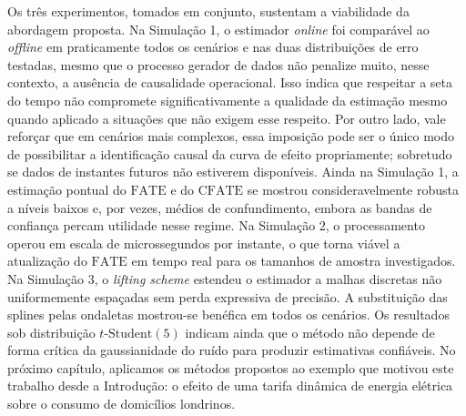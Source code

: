 Os três experimentos, tomados em conjunto, sustentam a viabilidade da abordagem proposta. 
Na Simulação 1, o estimador \emph{online} foi comparável ao \emph{offline} em praticamente todos os cenários e nas duas distribuições de erro testadas, mesmo que o processo gerador de dados não penalize muito, nesse contexto, a ausência de causalidade operacional. 
Isso indica que respeitar a seta do tempo não compromete significativamente a qualidade da estimação mesmo quando aplicado a situações que não exigem esse respeito.
Por outro lado, vale reforçar que em cenários mais complexos, essa imposição pode ser o único modo de possibilitar a identificação causal da curva de efeito propriamente; sobretudo se dados de instantes futuros não estiverem disponíveis. 
Ainda na Simulação 1, a estimação pontual do \(\mathrm{FATE}\) e do \(\mathrm{CFATE}\) se mostrou consideravelmente robusta a níveis baixos e, por vezes, médios de confundimento, embora as bandas de confiança percam utilidade nesse regime. 
Na Simulação 2, o processamento operou em escala de microssegundos por instante, o que torna viável a atualização do \(\mathrm{FATE}\) em tempo real para os tamanhos de amostra investigados. 
Na Simulação 3, o \emph{lifting scheme} estendeu o estimador a malhas discretas não uniformemente espaçadas sem perda expressiva de precisão. 
A substituição das splines pelas ondaletas mostrou-se benéfica em todos os cenários. Os resultados sob distribuição \(t\text{-Student}(5)\) indicam ainda que o método não depende de forma crítica da gaussianidade do ruído para produzir estimativas confiáveis. 
No próximo capítulo, aplicamos os métodos propostos ao exemplo que motivou este trabalho desde a Introdução: o efeito de uma tarifa dinâmica de energia elétrica sobre o consumo de domicílios londrinos.
